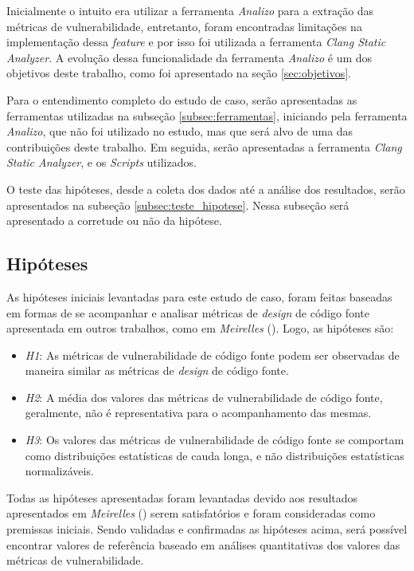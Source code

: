 Inicialmente o intuito era utilizar a ferramenta \emph{Analizo} para a extração
das métricas de vulnerabilidade, entretanto, foram encontradas limitações na
implementação dessa \textit{feature} e por isso foi utilizada a ferramenta
\emph{Clang Static Analyzer}. A evolução dessa funcionalidade da ferramenta
\emph{Analizo} é um dos objetivos deste trabalho, como foi apresentado na seção
\ref{sec:objetivos}.

Para o entendimento completo do estudo de caso, serão apresentadas as
ferramentas utilizadas na subseção \ref{subsec:ferramentas}, iniciando pela ferramenta \emph{Analizo}, que
não foi utilizado no estudo, mas que será alvo de uma das contribuições deste
trabalho. Em seguida, serão apresentadas a ferramenta \emph{Clang Static
Analyzer}, e os \textit{Scripts} utilizados.

O teste das hipóteses, desde a coleta dos dados até a análise dos resultados, serão
apresentados na subseção \ref{subsec:teste_hipotese}. Nessa subseção será
apresentado a corretude ou não da hipótese.

\subsection{Hipóteses} \label{subsec:hipoteses}

As hipóteses iniciais levantadas para este estudo de caso, foram feitas baseadas em
formas de se acompanhar e analisar métricas de \textit{design} de código fonte
apresentada em outros trabalhos, como em \emph{Meirelles}
(\citeyear{meirelles2013}). Logo, as hipóteses são:

\begin{itemize}
  \item \textit{H1}: As métricas de vulnerabilidade de código fonte podem ser
    observadas de maneira similar as métricas de \textit{design} de código
    fonte.
  \item \textit{H2}: A média dos valores das métricas de vulnerabilidade de
    código fonte, geralmente, não é representativa para o acompanhamento das mesmas.
  \item \textit{H3}: Os valores das métricas de vulnerabilidade de código fonte
    se comportam como distribuições estatísticas de cauda longa, e não
    distribuições estatísticas normalizáveis.
\end{itemize}

Todas as hipóteses apresentadas foram levantadas devido aos resultados apresentados em
\emph{Meirelles} (\citeyear{meirelles2013}) serem satisfatórios e foram
consideradas como premissas iniciais. Sendo validadas e confirmadas as hipóteses
acima, será possível encontrar valores de referência baseado em análises
quantitativas dos valores das métricas de vulnerabilidade. 


